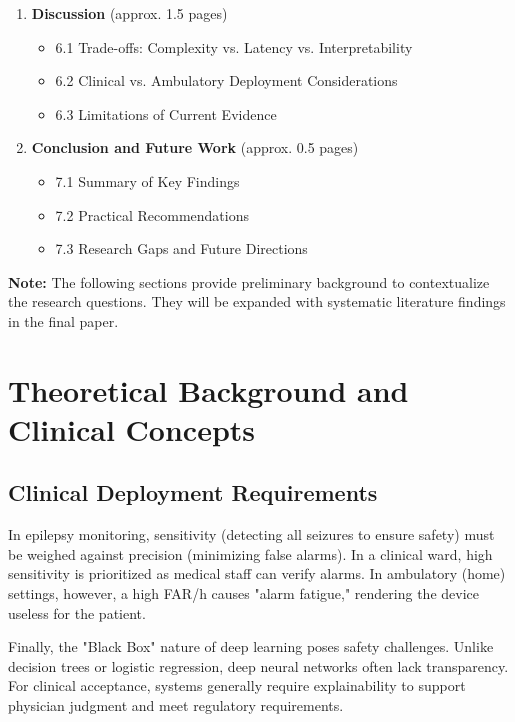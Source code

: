 \begin{enumerate}
  \item \textbf{Discussion} (approx. 1.5 pages)
    \begin{itemize}
      \item 6.1 Trade-offs: Complexity vs. Latency vs. Interpretability
      \item 6.2 Clinical vs. Ambulatory Deployment Considerations
      \item 6.3 Limitations of Current Evidence
    \end{itemize}
    
  \item \textbf{Conclusion and Future Work} (approx. 0.5 pages)
    \begin{itemize}
      \item 7.1 Summary of Key Findings
      \item 7.2 Practical Recommendations
      \item 7.3 Research Gaps and Future Directions
    \end{itemize}
\end{enumerate}

\vspace{1em}
\noindent\textbf{Note:} The following sections provide preliminary background 
to contextualize the research questions. They will be expanded with 
systematic literature findings in the final paper.
\vspace{0.5em}

\section{Theoretical Background and Clinical Concepts}

\subsection{Clinical Deployment Requirements}
In epilepsy monitoring, sensitivity (detecting all
seizures to ensure safety) must be weighed against precision
(minimizing false alarms). In a clinical ward, high sensitivity is
prioritized as medical staff can verify alarms. In ambulatory (home)
settings, however, a high FAR/h causes "alarm
fatigue," rendering the device useless for the patient.

Finally, the "Black Box" nature of deep learning poses safety
challenges. Unlike decision trees or logistic regression, deep neural networks
often lack transparency. For clinical acceptance, systems generally
require explainability to support physician judgment and meet regulatory requirements.

